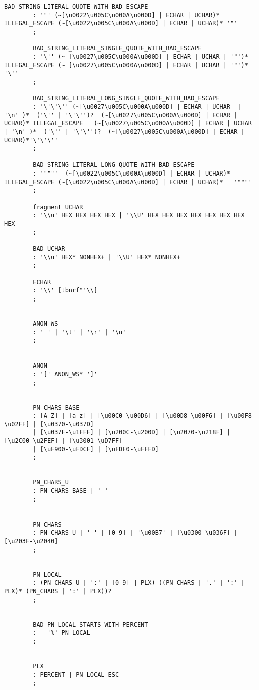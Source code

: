 \begin{lstlisting}[breaklines,basicstyle=\ttfamily]
		BAD_STRING_LITERAL_QUOTE_WITH_BAD_ESCAPE
		: '"' (~[\u0022\u005C\u000A\u000D] | ECHAR | UCHAR)* ILLEGAL_ESCAPE (~[\u0022\u005C\u000A\u000D] | ECHAR | UCHAR)* '"' 
		;
		
		BAD_STRING_LITERAL_SINGLE_QUOTE_WITH_BAD_ESCAPE
		: '\'' (~ [\u0027\u005C\u000A\u000D] | ECHAR | UCHAR | '"')*  ILLEGAL_ESCAPE (~ [\u0027\u005C\u000A\u000D] | ECHAR | UCHAR | '"')*  '\''
		;
		
		BAD_STRING_LITERAL_LONG_SINGLE_QUOTE_WITH_BAD_ESCAPE
		: '\'\'\'' (~[\u0027\u005C\u000A\u000D] | ECHAR | UCHAR  | '\n' )*  ('\'' | '\'\'')?  (~[\u0027\u005C\u000A\u000D] | ECHAR | UCHAR)* ILLEGAL_ESCAPE   (~[\u0027\u005C\u000A\u000D] | ECHAR | UCHAR  | '\n' )*  ('\'' | '\'\'')?  (~[\u0027\u005C\u000A\u000D] | ECHAR | UCHAR)*'\'\'\''  
		;
		
		BAD_STRING_LITERAL_LONG_QUOTE_WITH_BAD_ESCAPE
		: '"""'  (~[\u0022\u005C\u000A\u000D] | ECHAR | UCHAR)*   ILLEGAL_ESCAPE (~[\u0022\u005C\u000A\u000D] | ECHAR | UCHAR)*   '"""'
		;
		
		fragment UCHAR
		: '\\u' HEX HEX HEX HEX | '\\U' HEX HEX HEX HEX HEX HEX HEX HEX
		;
		
		BAD_UCHAR
		: '\\u' HEX* NONHEX+ | '\\U' HEX* NONHEX+ 
		;
		
		ECHAR
		: '\\' [tbnrf"'\\]
		;
		
		
		ANON_WS
		: ' ' | '\t' | '\r' | '\n'
		;
		
		
		ANON
		: '[' ANON_WS* ']'
		;
		
		
		PN_CHARS_BASE
		: [A-Z] | [a-z] | [\u00C0-\u00D6] | [\u00D8-\u00F6] | [\u00F8-\u02FF] | [\u0370-\u037D]
		| [\u037F-\u1FFF] | [\u200C-\u200D] | [\u2070-\u218F] | [\u2C00-\u2FEF] | [\u3001-\uD7FF]
		| [\uF900-\uFDCF] | [\uFDF0-\uFFFD]				   		   
		;
		
		
		PN_CHARS_U
		: PN_CHARS_BASE | '_'
		;
		
		
		PN_CHARS
		: PN_CHARS_U | '-' | [0-9] | '\u00B7' | [\u0300-\u036F] | [\u203F-\u2040]
		;
		
		
		PN_LOCAL
		: (PN_CHARS_U | ':' | [0-9] | PLX) ((PN_CHARS | '.' | ':' | PLX)* (PN_CHARS | ':' | PLX))?
		;
		
		
		BAD_PN_LOCAL_STARTS_WITH_PERCENT
		:   '%' PN_LOCAL
		;
		
		
		PLX
		: PERCENT | PN_LOCAL_ESC
		;
		

\end{lstlisting}

